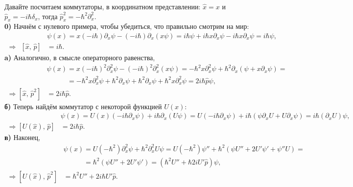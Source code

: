 Давайте посчитаем коммутаторы, в координатном представлении: $\hat{x} = x$ и $\hat{p}_x = - i \hbar \delta_x$, тогда $\hat{p}_x^2 = - \hbar^2 \partial_x^{2}$. 
\\
\textbf{0)} Начнём с нулевого примера, чтобы убедиться, что правильно смотрим на мир:
\begin{align*}
    [\hat{x},\, \hat{p}] &\psi(x) = 
    x (-i \hbar) \partial_x \psi - (-i \hbar) \partial_x (x \psi) = i \hbar \psi + i \hbar x \partial_x \psi - i \hbar x \partial_x \psi = i \hbar \psi,  \\ 
    \Rightarrow \ \ [\hat{x},\, \hat{p}] &= i \hbar.
\end{align*}
\textbf{a)} Аналогично, в смысле операторного равенства,
\begin{align*}
    [\hat{x},\, \hat{p}^2] &\psi(x) 
    = 
    x (-i \hbar)^2 \partial_x^2 \psi - (-i \hbar)^2 \partial_x^2 (x \psi) 
    = 
    - \hbar^2 x \partial_x^2 \psi + \hbar^2 \partial_x (\psi + x \partial_x \psi) 
    = \\ &\phantom{\psi(x)}= 
    - \hbar^2 x \partial_x^2 \psi + \hbar^2 \partial_x \psi + \hbar^2 \partial_x \psi + \hbar^2 x \partial_x^2 \psi = 2 i \hbar \hat{p} \psi,
    \\ \Rightarrow [\hat{x},\, \hat{p}^2] &= 2 i \hbar \hat{p}.
\end{align*}
\textbf{б)} Теперь найдём коммутатор с некоторой функцией $U(x)$:
\begin{align*}
    [U(\hat{x}),\, \hat{p}]&\psi(x) 
    = 
    U(x) (- i \hbar \partial_x \psi) + i \hbar \partial_x (U \psi) 
    = 
    U (- i \hbar \partial_x \psi) + i \hbar  (\psi \partial_x U + U \partial_x \psi)
    = 
    i \hbar (\partial_x U) \psi,
    \\ \Rightarrow [U(\hat{x}),\, \hat{p}] &= 2 i \hbar \hat{p}.
\end{align*}
\textbf{в)} Наконец, 
\begin{align*}
    [U(\hat{x}),\, \hat{p}^2]&\psi(x) 
    = 
    U (-\hbar^2) \partial_x^2 \psi + \hbar^2 \partial_x^2 U \psi
    =
    U (- \hbar^2) \psi'' + \hbar^2 (\psi U'' + 2 U' \psi' + \psi'' U) 
    = \\ &\phantom{\psi(x)}= 
    \hbar^2 (\psi U'' + 2 U' \psi') 
    =
    (\hbar^2 U'' + \hbar 2i U' \hat{p} )\psi,
    \\ \Rightarrow [U(\hat{x}),\, \hat{p}^2] &= \hbar^2 U'' + 2 i \hbar U' \hat{p}.
\end{align*}